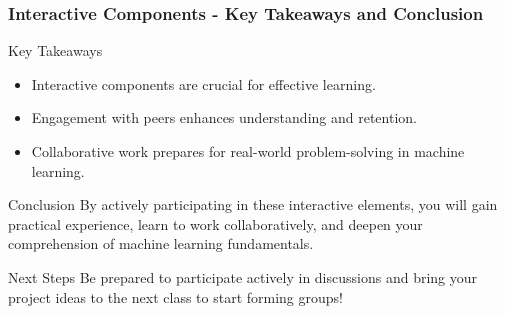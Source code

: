 \documentclass[aspectratio=169]{beamer}
\begin{document}
\begin{frame}[fragile]
  \frametitle{Interactive Components - Key Takeaways and Conclusion}
  \begin{block}{Key Takeaways}
    \begin{itemize}
      \item Interactive components are crucial for effective learning.
      \item Engagement with peers enhances understanding and retention.
      \item Collaborative work prepares for real-world problem-solving in machine learning.
    \end{itemize}
  \end{block}
  
  \begin{block}{Conclusion}
    By actively participating in these interactive elements, you will gain practical experience, learn to work collaboratively, and deepen your comprehension of machine learning fundamentals.
  \end{block}
  
  \begin{block}{Next Steps}
    Be prepared to participate actively in discussions and bring your project ideas to the next class to start forming groups!
  \end{block}
\end{frame}
\end{document}

